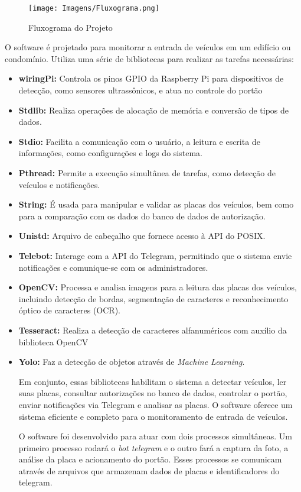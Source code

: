 \documentclass[conference]{IEEEtran}
\begin{document}
\begin{figure}[h]
    \centering
    \texttt{[image: Imagens/Fluxograma.png]}
    \caption{Fluxograma do Projeto}
    \label{fig:fluxograma}
\end{figure}

O software é projetado para monitorar a entrada de veículos em um edifício ou condomínio. Utiliza uma série de bibliotecas para realizar as tarefas necessárias:


\begin{itemize}
\item \textbf{wiringPi:} Controla os pinos GPIO da Raspberry Pi para dispositivos de detecção, como sensores ultrassônicos, e atua no controle do portão
\item \textbf{Stdlib:} Realiza operações de alocação de memória e conversão de tipos de dados.
\item \textbf{Stdio:} Facilita a comunicação com o usuário, a leitura e escrita de informações, como configurações e logs do sistema.
\item \textbf{Pthread:} Permite a execução simultânea de tarefas, como detecção de veículos e notificações.
\item \textbf{String:} É usada para manipular e validar as placas dos veículos, bem como para a comparação com os dados do banco de dados de autorização.
\item \textbf{Unistd:} Arquivo de cabeçalho que fornece acesso à API do POSIX.
\item \textbf{Telebot:} Interage com a API do Telegram, permitindo que o sistema envie notificações e comunique-se com os administradores.
\item \textbf{OpenCV:} Processa e analisa imagens para a leitura das placas dos veículos, incluindo detecção de bordas, segmentação de caracteres e reconhecimento óptico de caracteres (OCR).
\item \textbf{Tesseract:} Realiza a detecção de caracteres alfanuméricos com auxílio da biblioteca OpenCV
\item \textbf{Yolo:} Faz a detecção de objetos através de \textit{Machine Learning}.

Em conjunto, essas bibliotecas habilitam o sistema a detectar veículos, ler suas placas, consultar autorizações no banco de dados, controlar o portão, enviar notificações via Telegram e analisar as placas. O software oferece um sistema eficiente e completo para o monitoramento de entrada de veículos.

O software foi desenvolvido para atuar com dois processos simultâneas. Um primeiro processo rodará o \textit{bot telegram} e o outro fará a captura da foto, a análise da placa e acionamento do portão. Esses processos se comunicam através de arquivos que armazenam dados de placas e identificadores do telegram.


\end{itemize}
\end{document}
